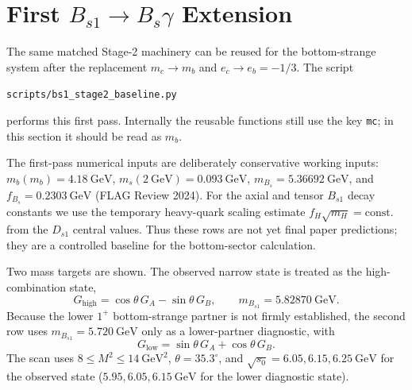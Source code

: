 \documentclass[11pt]{article}
\newcommand{\Bsone}{B_{s1}}
\newcommand{\GeV}{\mathrm{GeV}}
\begin{document}
\section{First \(B_{s1}\to B_s\gamma\) Extension}

The same matched Stage-2 machinery can be reused for the bottom-strange system
after the replacement $m_c\to m_b$ and $e_c\to e_b=-1/3$.  The script
\begin{center}
  \texttt{scripts/bs1\_stage2\_baseline.py}
\end{center}
performs this first pass.  Internally the reusable functions still use the key
\texttt{mc}; in this section it should be read as $m_b$.

The first-pass numerical inputs are deliberately conservative working inputs:
$m_b(m_b)=4.18~\GeV$, $m_s(2~\GeV)=0.093~\GeV$,
$m_{B_s}=5.36692~\GeV$, and $f_{B_s}=0.2303~\GeV$
(FLAG Review 2024).  For the axial and tensor
$B_{s1}$ decay constants we use the temporary heavy-quark scaling estimate
$f_H\sqrt{m_H}=\mathrm{const.}$ from the $D_{s1}$ central values.  Thus these
rows are not yet final paper predictions; they are a controlled baseline for
the bottom-sector calculation.

Two mass targets are shown.  The observed narrow state is treated as the
high-combination state,
\begin{equation}
  G_{\mathrm{high}}=\cos\theta\,G_A-\sin\theta\,G_B,
  \qquad m_{\Bsone}=5.82870~\GeV.
\end{equation}
Because the lower $1^+$ bottom-strange partner is not firmly established, the
second row uses $m_{\Bsone}=5.720~\GeV$ only as a lower-partner diagnostic, with
\begin{equation}
  G_{\mathrm{low}}=\sin\theta\,G_A+\cos\theta\,G_B.
\end{equation}
The scan uses $8\le M^2\le14~\GeV^2$, $\theta=35.3^\circ$, and
$\sqrt{s_0}=6.05,6.15,6.25~\GeV$ for the observed state
($5.95,6.05,6.15~\GeV$ for the lower diagnostic state).
\end{document}
